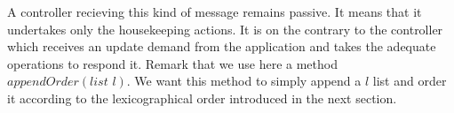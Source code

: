 \documentclass{article}
\theoremstyle{remark}
\begin{document}
A controller recieving this kind of message remains passive. It means that it undertakes only the housekeeping actions. It is on the contrary to the controller which receives an update demand from the application and takes the adequate operations to respond it.
Remark that we use here a method $appendOrder(\textit{list } l)$. We want this method to simply append a $l$ list and order it according to the lexicographical order introduced in the next section.
%

%
\end{document}

